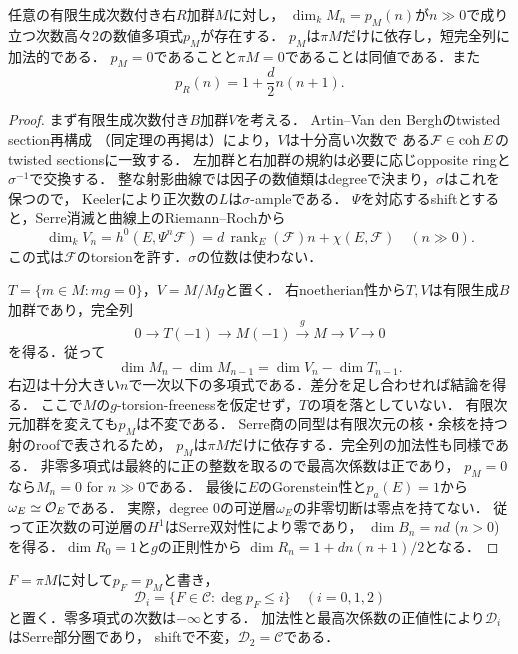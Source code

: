 \begin{lemma}[中心一次元によるHilbert多項式]\label{lem:elliptic-hilbert-polynomial}
任意の有限生成次数付き右$R$加群$M$に対し，
$\dim_kM_n=p_M(n)$が$n\gg0$で成り立つ次数高々2の数値多項式$p_M$が存在する．
$p_M$は$\pi M$だけに依存し，短完全列に加法的である．
$p_M=0$であることと$\pi M=0$であることは同値である．また
\[
 p_R(n)=1+\frac d2n(n+1).
\]
\end{lemma}
\begin{proof}
まず有限生成次数付き$B$加群$V$を考える．
Artin--Van den Berghのtwisted section再構成\cite[Theorems~1.3--1.4]{AV}
（同定理の再掲は\cite[Theorem~2.4]{CKS}）により，$V$は十分高い次数で
ある$\mathcal F\in\operatorname{coh} E$のtwisted sectionsに一致する．
左加群と右加群の規約は必要に応じopposite ringと$\sigma^{-1}$で交換する．
整な射影曲線では因子の数値類はdegreeで決まり，$\sigma$はこれを保つので，
Keeler\cite[Theorem~1.2]{Keeler}により正次数の$L$は$\sigma$-ampleである．
$\Psi$を対応するshiftとすると，Serre消滅と曲線上のRiemann--Rochから
\[
 \dim_kV_n=h^0(E,\Psi^n\mathcal F)
 =d\,\operatorname{rank}_E(\mathcal F)n+\chi(E,\mathcal F)
 \quad(n\gg0).
\]
この式は$\mathcal F$のtorsionを許す．$\sigma$の位数は使わない．

$T=\{m\in M:mg=0\}$，$V=M/Mg$と置く．
右noetherian性から$T,V$は有限生成$B$加群であり，完全列
\begin{equation}\label{eq:elliptic-difference-sequence}
 0\longrightarrow T(-1)\longrightarrow M(-1)
 \xrightarrow{\,g\,}M\longrightarrow V\longrightarrow0
\end{equation}
を得る．従って
\begin{equation}\label{eq:elliptic-difference}
 \dim M_n-\dim M_{n-1}=\dim V_n-\dim T_{n-1}.
\end{equation}
右辺は十分大きい$n$で一次以下の多項式である．差分を足し合わせれば結論を得る．
ここで$M$の$g$-torsion-freenessを仮定せず，$T$の項を落としていない．
有限次元加群を変えても$p_M$は不変である．
Serre商の同型は有限次元の核・余核を持つ射のroofで表されるため，
$p_M$は$\pi M$だけに依存する．完全列の加法性も同様である．
非零多項式は最終的に正の整数を取るので最高次係数は正であり，
$p_M=0$なら$M_n=0$ for $n\gg0$である．
最後に$E$のGorenstein性と$p_a(E)=1$から$\omega_E\simeq\mathcal O_E$である．
実際，degree 0の可逆層$\omega_E$の非零切断は零点を持てない．
従って正次数の可逆層の$H^1$はSerre双対性により零であり，
$\dim B_n=nd$ ($n>0$)を得る．$\dim R_0=1$と$g$の正則性から
$\dim R_n=1+dn(n+1)/2$となる．
\end{proof}

$F=\pi M$に対して$p_F=p_M$と書き，
\[
 \mathcal D_i=\{F\in\mathcal C:\deg p_F\leq i\}\quad(i=0,1,2)
\]
と置く．零多項式の次数は$-\infty$とする．
加法性と最高次係数の正値性により$\mathcal D_i$はSerre部分圏であり，
shiftで不変，$\mathcal D_2=\mathcal C$である．

